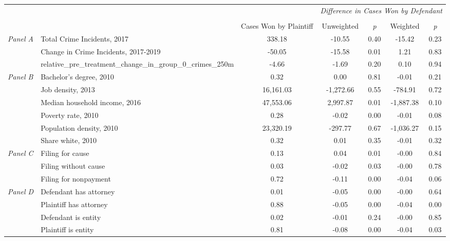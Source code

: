 \begin{tabular}{llccccc}
\toprule
 &  & \textit{} & \multicolumn{4}{c}{\textit{Difference in Cases Won by Defendant}} \\
\cline{4-7}
\\
 &  & Cases Won by Plaintiff & Unweighted & \emph{p} & Weighted & \emph{p} \\
\midrule
\multirow[c]{3}{.75cm}{\textit{Panel A}} & Total Crime Incidents, 2017 & 338.18 & -10.55 & 0.40 & -15.42 & 0.23 \\
 & Change in Crime Incidents, 2017-2019 & -50.05 & -15.58 & 0.01 & 1.21 & 0.83 \\
 & relative_pre_treatment_change_in_group_0_crimes_250m & -4.66 & -1.69 & 0.20 & 0.10 & 0.94 \\
\cline{1-7}
\multirow[c]{6}{.75cm}{\textit{Panel B}} & Bachelor's degree, 2010 & 0.32 & 0.00 & 0.81 & -0.01 & 0.21 \\
 & Job density, 2013 & 16,161.03 & -1,272.66 & 0.55 & -784.91 & 0.72 \\
 & Median household income, 2016 & 47,553.06 & 2,997.87 & 0.01 & -1,887.38 & 0.10 \\
 & Poverty rate, 2010 & 0.28 & -0.02 & 0.00 & -0.01 & 0.08 \\
 & Population density, 2010 & 23,320.19 & -297.77 & 0.67 & -1,036.27 & 0.15 \\
 & Share white, 2010 & 0.32 & 0.01 & 0.35 & -0.01 & 0.32 \\
\cline{1-7}
\multirow[c]{3}{.75cm}{\textit{Panel C}} & Filing for cause & 0.13 & 0.04 & 0.01 & -0.00 & 0.84 \\
 & Filing without cause & 0.03 & -0.02 & 0.03 & -0.00 & 0.78 \\
 & Filing for nonpayment & 0.72 & -0.11 & 0.00 & -0.04 & 0.06 \\
\cline{1-7}
\multirow[c]{4}{.75cm}{\textit{Panel D}} & Defendant has attorney & 0.01 & -0.05 & 0.00 & -0.00 & 0.64 \\
 & Plaintiff has attorney & 0.88 & -0.05 & 0.00 & -0.04 & 0.00 \\
 & Defendant is entity & 0.02 & -0.01 & 0.24 & -0.00 & 0.85 \\
 & Plaintiff is entity & 0.81 & -0.08 & 0.00 & -0.04 & 0.03 \\
\cline{1-7}
\bottomrule
\end{tabular}
